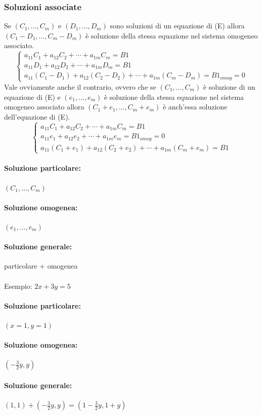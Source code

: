 \documentclass[12pt,a4paper]{article}
\begin{document}
\subsubsection{Soluzioni associate}
Se $(C_1,\ldots,C_m)$ e $(D_1,\ldots,D_m)$ sono soluzioni di un equazione di (E) allora
$(C_1 - D_1,\ldots,C_m - D_m)$ è soluzione della stessa equazione nel sistema omogeneo associato.
\[
\begin{cases}
  a_{11}C_1 + a_{12}C_2 + \cdots + a_{1m}C_m = B1\\
  a_{11}D_1 + a_{12}D_2 + \cdots + a_{1m}D_m = B1\\
  a_{11}(C_1 - D_1) + a_{12}(C_2 - D_2) + \cdots + a_{1m}(C_m - D_m) = B1_{omog} = 0
\end{cases}
\]
Vale ovviamente anche il contrario, ovvero che se $(C_1,\ldots,C_m)$ è soluzione di un equazione di (E) e $(e_1,\ldots,e_m)$ è soluzione
della stessa equazione nel sistema omogeneo associato allora $(C_1 + e_1,\ldots,C_m + e_m)$ è anch'essa soluzione dell'equazione di (E).
\[
\begin{cases}
  a_{11}C_1 + a_{12}C_2 + \cdots + a_{1m}C_m = B1\\
  a_{11}e_1 + a_{12}e_2 + \cdots + a_{1m}e_m = B1_{omog} = 0\\
  a_{11}(C_1 + e_1) + a_{12}(C_2 + e_2) + \cdots + a_{1m}(C_m + e_m) = B1
\end{cases}
\]
\paragraph{Soluzione particolare:} $(C_1,\ldots,C_m)$
\paragraph{Soluzione omogenea:} $(e_1,\ldots,e_m)$
\paragraph{Soluzione generale:} particolare + omogenea\\\\
Esempio: $2x + 3y = 5$
\paragraph{Soluzione particolare:} $(x = 1,y = 1)$
\paragraph{Soluzione omogenea:} $(-\frac{3}{2}y,y)$
\paragraph{Soluzione generale:} $(1,1) + (-\frac{3}{2}y,y) = (1 - \frac{3}{2}y,1 + y)$
\end{document}
